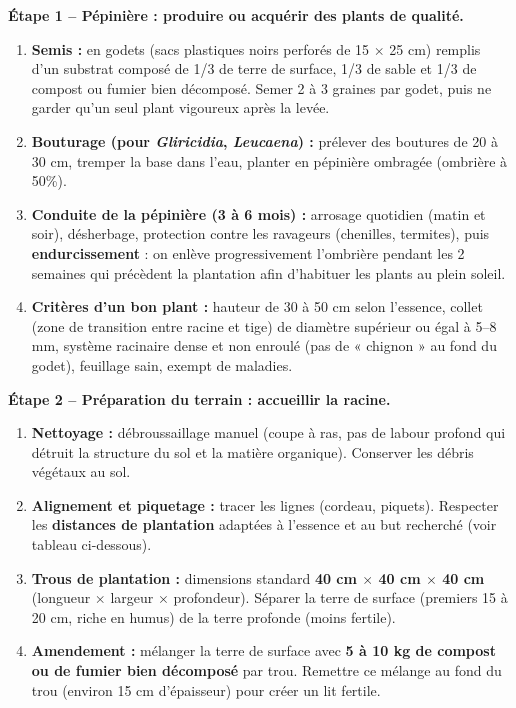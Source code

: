 \documentclass[11pt]{article}
\begin{document}
\begin{methode}
\textbf{Étape 1 -- Pépinière : produire ou acquérir des plants de qualité.}
\begin{enumerate}
    \item \textbf{Semis :} en godets (sacs plastiques noirs perforés de 15 $\times$ 25 cm) remplis d'un substrat composé de 1/3 de terre de surface, 1/3 de sable et 1/3 de compost ou fumier bien décomposé. Semer 2 à 3 graines par godet, puis ne garder qu'un seul plant vigoureux après la levée.
    \item \textbf{Bouturage (pour \textit{Gliricidia}, \textit{Leucaena}) :} prélever des boutures de 20 à 30 cm, tremper la base dans l'eau, planter en pépinière ombragée (ombrière à 50\%).
    \item \textbf{Conduite de la pépinière (3 à 6 mois) :} arrosage quotidien (matin et soir), désherbage, protection contre les ravageurs (chenilles, termites), puis \textbf{endurcissement} : on enlève progressivement l'ombrière pendant les 2 semaines qui précèdent la plantation afin d'habituer les plants au plein soleil.
    \item \textbf{Critères d'un bon plant :} hauteur de 30 à 50 cm selon l'essence, collet (zone de transition entre racine et tige) de diamètre supérieur ou égal à 5--8 mm, système racinaire dense et non enroulé (pas de « chignon » au fond du godet), feuillage sain, exempt de maladies.
\end{enumerate}

\textbf{Étape 2 -- Préparation du terrain : accueillir la racine.}
\begin{enumerate}
    \item \textbf{Nettoyage :} débroussaillage manuel (coupe à ras, pas de labour profond qui détruit la structure du sol et la matière organique). Conserver les débris végétaux au sol.
    \item \textbf{Alignement et piquetage :} tracer les lignes (cordeau, piquets). Respecter les \textbf{distances de plantation} adaptées à l'essence et au but recherché (voir tableau ci-dessous).
    \item \textbf{Trous de plantation :} dimensions standard \textbf{40 cm $\times$ 40 cm $\times$ 40 cm} (longueur $\times$ largeur $\times$ profondeur). Séparer la terre de surface (premiers 15 à 20 cm, riche en humus) de la terre profonde (moins fertile).
    \item \textbf{Amendement :} mélanger la terre de surface avec \textbf{5 à 10 kg de compost ou de fumier bien décomposé} par trou. Remettre ce mélange au fond du trou (environ 15 cm d'épaisseur) pour créer un lit fertile.
\end{enumerate}


\end{methode}
\end{document}
